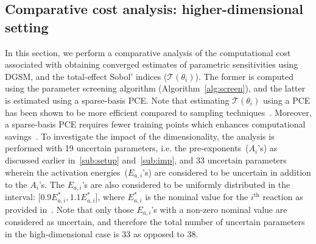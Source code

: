 \subsection{Comparative cost analysis: higher-dimensional setting}
\label{sub:cost}

In this section, we perform a comparative analysis of the computational cost
associated with obtaining converged estimates of parametric sensitivities
using DGSM, and the total-effect Sobol' indices ($\mathcal{T}(\theta_i)$). The former is computed
using the parameter screening algorithm (Algorithm~\ref{alg:screen}), and the latter is
estimated using a sparse-basis PCE. Note that estimating $\mathcal{T}(\theta_i)$
using a PCE has been shown to be more efficient compared to sampling 
techniques~\cite{Crestaux:2009,BlatmanSudret10}.
Moreover, a sparse-basis PCE requires fewer training points which
enhances computational savings~\cite{Sudret:2008,Blatman:2009}. 
To investigate the impact of the dimensionality, the
analysis is performed with 19 uncertain parameters, i.e.
the pre-exponents~($A_i$'s) as discussed earlier in~\ref{sub:setup} and~\ref{sub:imp}, and
33 uncertain parameters wherein the activation energies~($E_{a,i}$'s) are considered to
be uncertain in addition to the $A_i$'s. The $E_{a,i}$'s are also considered to be uniformly distributed in the
interval: [$0.9E_{a,i}^\ast,1.1E_{a,i}^\ast$], where $E_{a,i}^\ast$ is the nominal value
for the $i^\text{th}$ reaction as provided in~\cite{Yetter:1991}. Note that only those
$E_{a,i}$'s with a non-zero nominal value are considered as uncertain, and therefore the
total number of uncertain parameters in the high-dimensional case is 33 as opposed to 38. 

